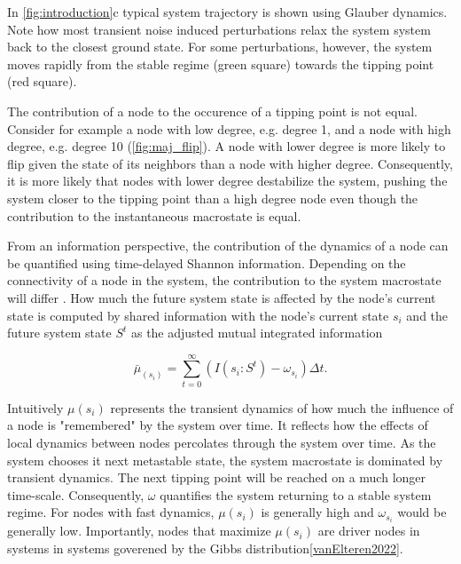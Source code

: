 \documentclass[a4paper, 11pt, twocolumn]{article}
\begin{document}
In \cref{fig:introduction}{c} typical system trajectory is shown using Glauber dynamics. Note how most transient noise induced perturbations relax the system system back to the closest ground state. For some perturbations, however, the system moves rapidly from the stable regime (green square) towards the tipping point (red square).

The contribution of a node to the occurence of a tipping point is not equal. Consider for example a node with low degree, e.g. degree 1, and a node with high degree, e.g. degree 10 (\cref{fig:maj_flip}). A node with lower degree is more likely to flip given the state of its neighbors than a node with higher degree. Consequently, it is more likely that nodes with lower degree destabilize the system, pushing the system closer to the tipping point than a high degree node even though the contribution to the instantaneous macrostate is equal.


From an information perspective, the contribution of the dynamics of a node can be quantified using time-delayed Shannon information. Depending on the connectivity of a node in the system, the contribution to the system macrostate will differ \cite{vanElteren2022,Quax2013}. How much the future system state is affected by the node's current state is computed by shared information with the node's current state $s_i$ and the future system state $S^t$ as the adjusted mutual integrated information

\begin{equation}
\label{eq:adj_imi}
\bar \mu_(s_i) = \sum_{t = 0}^\infty (I(s_i : S^t) - \omega_{s_i}) \Delta t.
\end{equation}

Intuitively $\mu(s_i)$ represents the transient dynamics of how much the influence of a node is "remembered" by the system over time. It reflects how the effects of local dynamics between nodes percolates through the system over time. As the system chooses it next metastable state, the system macrostate is dominated by transient dynamics. The next tipping point will be reached on a much longer time-scale. Consequently, $\omega$ quantifies the system returning to a stable system regime. For nodes with fast dynamics, $\mu(s_i)$ is generally high and $\omega_{s_i}$ would be generally low. Importantly, nodes that maximize $\mu(s_i)$ are driver nodes in systems in systems goverened by the Gibbs distribution\ref{vanElteren2022}.
\end{document}
